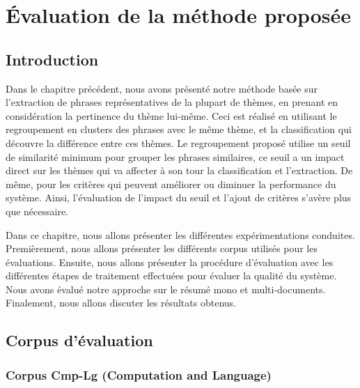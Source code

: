 \documentclass[a4paper,12pt,oneside]{../use/ESIthesis}
\begin{document}
  	 	
  	 	\dominitoc 
  	 	\mainmatter
  \fi

\chapter{Évaluation de la méthode proposée}
\label{chap:evalMine}
\minitoc

\section{Introduction}

Dans le chapitre précédent, nous avons présenté notre méthode basée sur l'extraction de phrases représentatives de la plupart de thèmes, en prenant en considération la pertinence du thème lui-même. 
Ceci est réalisé en utilisant le regroupement en clusters des phrases avec le même thème, et la classification qui découvre la différence entre ces thèmes. 
Le regroupement proposé utilise un seuil de similarité minimum pour grouper les phrases similaires, ce seuil a un impact direct sur les thèmes qui va affecter à son tour la classification et l'extraction. 
De même, pour les critères qui peuvent améliorer ou diminuer la performance du système.
Ainsi, l'évaluation de l'impact du seuil et l'ajout de critères s'avère plus que nécessaire. 

Dans ce chapitre, nous allons présenter les différentes expérimentations conduites. 
Premièrement, nous allons présenter les différents corpus utilisés pour les évaluations. 
Ensuite, nous allons présenter la procédure d'évaluation avec les différentes étapes de traitement effectuées pour évaluer la qualité du système. 
Nous avons évalué notre approche sur le résumé mono et multi-documents. 
Finalement, nous allons discuter les résultats obtenus. 

\section{Corpus d'évaluation}

\subsection{Corpus Cmp-Lg (Computation and Language) }
\end{document}
